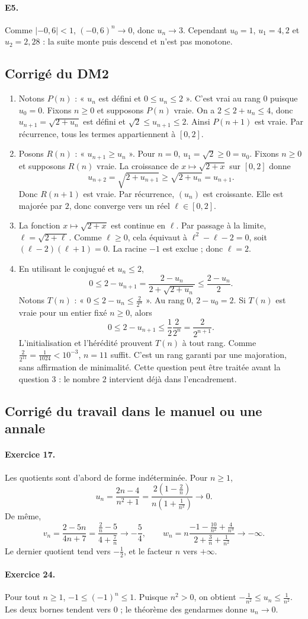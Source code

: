 \paragraph{E5.}Comme $|-0{,}6|<1$, $(-0{,}6)^n\to0$, donc $u_n\to3$. Cependant $u_0=1$, $u_1=4{,}2$ et $u_2=2{,}28$ : la suite monte puis descend et n'est pas monotone.

\subsection{Corrigé du DM2}\begin{enumerate}
\item Notons $P(n)$ : « $u_n$ est défini et $0\le u_n\le2$ ». C'est vrai au rang $0$ puisque $u_0=0$. Fixons $n\ge0$ et supposons $P(n)$ vraie. On a $2\le2+u_n\le4$, donc $u_{n+1}=\sqrt{2+u_n}$ est défini et $\sqrt2\le u_{n+1}\le2$. Ainsi $P(n+1)$ est vraie. Par récurrence, tous les termes appartiennent à $[0,2]$.
\item Posons $R(n)$ : « $u_{n+1}\ge u_n$ ». Pour $n=0$, $u_1=\sqrt2\ge0=u_0$. Fixons $n\ge0$ et supposons $R(n)$ vraie. La croissance de $x\mapsto\sqrt{2+x}$ sur $[0,2]$ donne
\[u_{n+2}=\sqrt{2+u_{n+1}}\ge\sqrt{2+u_n}=u_{n+1}.\]
Donc $R(n+1)$ est vraie. Par récurrence, $(u_n)$ est croissante. Elle est majorée par $2$, donc converge vers un réel $\ell\in[0,2]$.
\item La fonction $x\mapsto\sqrt{2+x}$ est continue en $\ell$. Par passage à la limite, $\ell=\sqrt{2+\ell}$. Comme $\ell\ge0$, cela équivaut à $\ell^2-\ell-2=0$, soit $(\ell-2)(\ell+1)=0$. La racine $-1$ est exclue ; donc $\ell=2$.
\item En utilisant le conjugué et $u_n\le2$,
\[0\le2-u_{n+1}=\frac{2-u_n}{2+\sqrt{2+u_n}}\le\frac{2-u_n}{2}.\]
Notons $T(n)$ : « $0\le2-u_n\le\frac{2}{2^n}$ ». Au rang $0$, $2-u_0=2$. Si $T(n)$ est vraie pour un entier fixé $n\ge0$, alors
\[0\le2-u_{n+1}\le\frac12\frac2{2^n}=\frac2{2^{n+1}}.\]
L'initialisation et l'hérédité prouvent $T(n)$ à tout rang. Comme $\frac{2}{2^{11}}=\frac{1}{1024}<10^{-3}$, $n=11$ suffit. C'est un rang garanti par une majoration, sans affirmation de minimalité. Cette question peut être traitée avant la question 3 : le nombre $2$ intervient déjà dans l'encadrement.
\end{enumerate}

\subsection{Corrigé du travail dans le manuel ou une annale}\paragraph{Exercice 17.} Les quotients sont d'abord de forme indéterminée. Pour $n\ge1$,
\[u_n=\frac{2n-4}{n^2+1}=\frac{2\left(1-\frac2n\right)}{n\left(1+\frac1{n^2}\right)}\longrightarrow0.\]
De même,
\[v_n=\frac{2-5n}{4n+7}=\frac{\frac2n-5}{4+\frac7n}\longrightarrow-\frac54,\qquad w_n=n\frac{-1-\frac{10}{n^2}+\frac4{n^3}}{2+\frac3n+\frac1{n^2}}\longrightarrow-\infty.\]
Le dernier quotient tend vers $-\frac12$, et le facteur $n$ vers $+\infty$.
\paragraph{Exercice 24.} Pour tout $n\ge1$, $-1\le(-1)^n\le1$. Puisque $n^2>0$, on obtient $-\frac1{n^2}\le u_n\le\frac1{n^2}$. Les deux bornes tendent vers $0$ ; le théorème des gendarmes donne $u_n\to0$.

\fi

